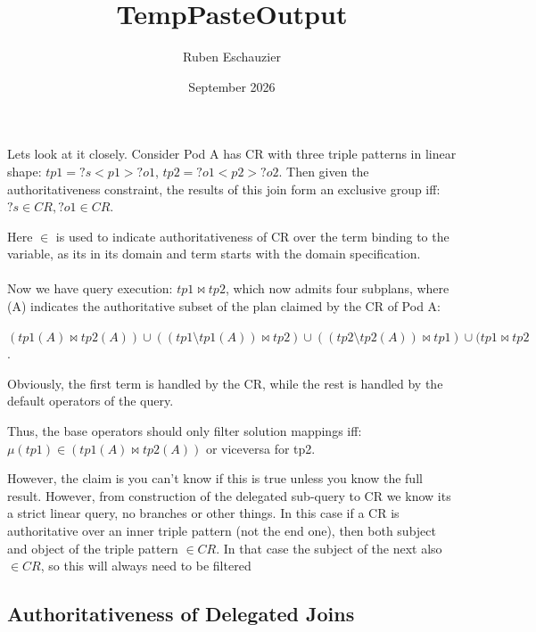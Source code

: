 \documentclass{article}
\title{TempPasteOutput}
\author{Ruben Eschauzier}
\date{September 2026}
\begin{document}
\maketitle



Lets look at it closely. Consider Pod A has CR with three triple patterns in linear shape:
$tp1 = ?s <p1> ?o1 $, $tp2 = ?o1 <p2> ?o2$.
Then given the authoritativeness constraint, the results of this join form an exclusive group iff:
$?s \in CR, ?o1\in CR$.

Here $\in$ is used to indicate authoritativeness of CR over the term binding to the variable, as its in its domain and term starts with the domain specification.
\\ \\
Now we have query execution:
$tp1 \Join tp2$, which now admits four subplans, where (A) indicates the authoritative subset of the plan claimed by the CR of Pod A:

$(tp1(A) \Join tp2(A)) \cup ((tp1 \setminus tp1(A)) \Join tp2) \cup ((tp2 \setminus tp2(A)) \Join tp1) \cup (tp1\Join tp2$.

Obviously, the first term is handled by the CR, while the rest is handled by the default operators of the query.

Thus, the base operators should only filter solution mappings iff:
$\mu(tp1) \in (tp1(A) \Join tp2(A))$ or viceversa for tp2.

However, the claim is you can't know if this is true unless you know the full result. However, from construction of the delegated sub-query to CR we know its a strict linear query, no branches or other things. In this case if a CR is authoritative over an inner triple pattern (not the end one), then both subject and object of the triple pattern $\in CR$.
In that case the subject of the next also $\in CR$, so this will always need to be filtered


\subsection*{Authoritativeness of Delegated Joins}
\end{document}
